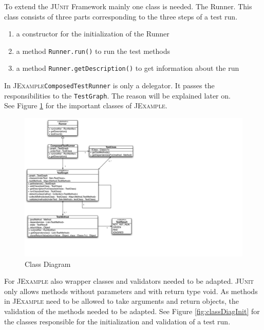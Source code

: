 \documentclass[11pt]{article}
\newcommand{\JUnit}{\textsc{JUnit}\xspace}
\newcommand{\JExample}{\textsc{JExample}\xspace}
\begin{document}
To extend the \JUnit Framework mainly one class is needed. The Runner. This class consists of three parts corresponding to the three steps of a test run.

\begin{enumerate}
 \item a constructor for the initialization of the Runner
 \item a method \verb|Runner.run()| to run the test methods
 \item a method \verb|Runner.getDescription()| to get information about the run
\end{enumerate}
In \JExample \verb|ComposedTestRunner| is only a delegator. It passes the responsibilities to the \verb|TestGraph|. The reason will be explained later on.\\
See Figure \ref{fig:classDiag} for the important classes of \JExample.

\begin{figure}[htbp]
 \includegraphics[width=24.0cm]{classdiagram.pdf}
 \caption{Class Diagram}
 \label{fig:classDiag}
\end{figure}

For \JExample also wrapper classes and validators needed to be adapted. \JUnit only allows methods without parameters and with return type void. As methods in \JExample need to be allowed to take arguments and return objects, the validation of the methods needed to be adapted. See Figure \ref{fig:classDiagInit} for the classes responsible for the initialization and validation of a test run.
\end{document}
